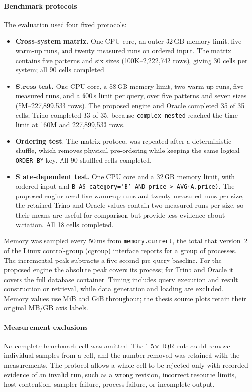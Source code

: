 \documentclass[preprint,12pt,times,a4paper]{elsarticle}
\begin{document}
\paragraph{Benchmark protocols}
The evaluation used four fixed protocols:
\begin{itemize}
  \item \textbf{Cross-system matrix.} One CPU core, an outer 32\,GB memory
    limit, five warm-up runs, and twenty measured runs on ordered input. The
    matrix contains five patterns and six sizes (100K--2,222,742 rows), giving
    30 cells per system; all 90 cells completed.
  \item \textbf{Stress test.} One CPU core, a 58\,GB memory limit, two warm-up
    runs, five measured runs, and a 600\,s limit per query, over five patterns
    and seven sizes (5M--227,899,533 rows). The proposed engine and Oracle
    completed 35 of 35 cells; Trino completed 33 of 35, because
    \texttt{complex\_nested} reached the time limit at 160M and 227,899,533 rows.
  \item \textbf{Ordering test.} The matrix protocol was repeated after a
    deterministic shuffle, which removes physical pre-ordering while keeping
    the same logical \texttt{ORDER BY} key. All 90 shuffled cells completed.
  \item \textbf{State-dependent test.} One CPU core and a 32\,GB memory limit,
    with ordered input and \texttt{B AS category='B' AND price > AVG(A.price)}.
    The proposed engine used five warm-up runs and twenty measured runs per
    size; the retained Trino and Oracle values contain two measured runs per
    size, so their means are useful for comparison but provide less evidence
    about variation. All 18 cells completed.
\end{itemize}

Memory was sampled every 50\,ms from \texttt{memory.current}, the total that
version~2 of the Linux control-group (cgroup) interface reports for a group of
processes. The incremental peak subtracts a five-second pre-query baseline.
For the proposed engine the absolute peak covers its process; for Trino and
Oracle it covers the full database container. Timing includes query execution
and result construction or retrieval, while data generation and loading are
excluded. Memory values use MiB and GiB throughout; the thesis source plots
retain their original MB/GB axis labels.

\paragraph{Measurement exclusions}
No complete benchmark cell was omitted. The 1.5$\times$ IQR rule could remove
individual samples from a cell, and the number removed was retained with the
measurements. The protocol allows a whole cell to be rejected only with recorded evidence
of an invalid run, such as a wrong revision, incorrect resource
limits, host contention, sampler failure, process failure, or incomplete
output.
\end{document}
